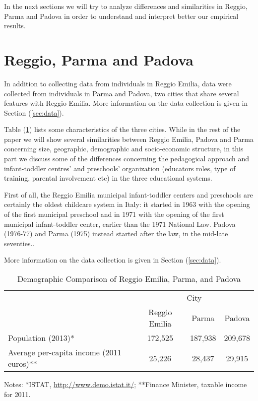 \documentclass[12pt]{article}
\begin{document}
In the next sections we will try to analyze differences and similarities in
Reggio, Parma and Padova in order to understand and interpret better our
empirical results.

\section{Reggio, Parma and Padova}

In addition to collecting data from individuals in Reggio Emilia, data were
collected from individuals in Parma and Padova, two cities that share
several features with Reggio Emilia. More information on the data collection
is given in Section (\ref{sec:data}).

Table (\ref{tab:comparison}) lists some characteristics of the three cities.
While in the rest of the paper we will show several similarities between
Reggio Emilia, Padova and Parma concerning size, geographic, demographic and
socio-economic structure, in this part we discuss some of the differences
concerning the pedagogical approach and infant-toddler centres' and
preschools' organization (educators roles, type of training, parental
involvement etc) in the three educational systems.

First of all, the Reggio Emilia municipal infant-toddler centers and
preschools are certainly the oldest childcare system in Italy: it started in
1963 with the opening of the first municipal preschool and in 1971 with the
opening of the first municipal infant-toddler center, earlier than the 1971
National Law. Padova (1976-77) and Parma (1975) instead started after the
law, in the mid-late seventies..

More information on the data collection is given in Section (\ref{sec:data}).

\begin{table}[tbph]
\caption{Demographic Comparison of Reggio Emilia, Parma, and Padova}
\label{tab:comparison}
\begin{center}
\begin{tabular}{lccc}
\hline\hline
& \multicolumn{3}{c}{City} \\ 
\cmidrule{2-4} & Reggio Emilia & Parma & Padova \\ \hline
Population (2013)* & 172,525 & 187,938 & 209,678 \\ 
Average per-capita income (2011 euros)** & 25,226 & 28,437 & 29,915 \\ \hline
\end{tabular}%
\end{center}
\par
{\footnotesize Notes: *ISTAT, \url{http://www.demo.istat.it/}; **Finance
Minister, taxable income for 2011. }
\end{table}
\end{document}
